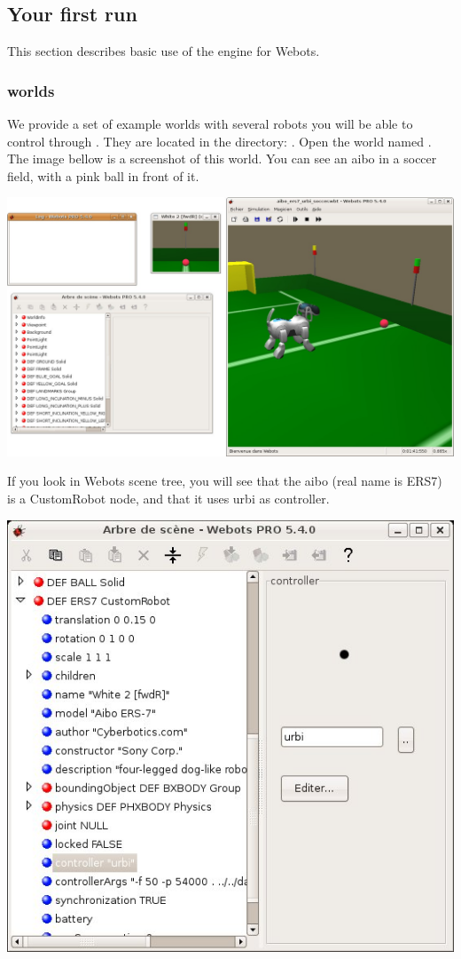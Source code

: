 \subsection{Your first run}

This section describes basic use of the \urbi engine for Webots.

\subsubsection{\urbi worlds}

We provide a set of example worlds with several robots you will be
able to control through \urbi. They are located in the directory:
.  Open the
world named . The image bellow is a
screenshot of this world. You can see an aibo in a soccer field, with
a pink ball in front of it.


\begin{center}
  \includegraphics[width=\linewidth]{img/webots/aibo-soccer}
\end{center}

If you look in Webots scene tree, you will see that the aibo (real
name is ERS7) is a CustomRobot node, and that it uses urbi as
controller.

\begin{center}
  \includegraphics[width=.8\linewidth]{img/webots/scene-tree}
\end{center}


